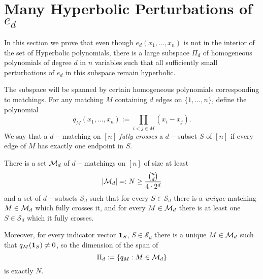 \section{Many Hyperbolic Perturbations of $e_d$} \label{sec:many-ed}
In this section we prove that even though $e_d(x_1,\ldots,x_n)$ is not in the
interior of the set of Hyperbolic polynomials, there is a large subspace
$\Pi_d$ of homogeneous polynomials of degree $d$ in $n$ variables such
that all sufficiently small perturbations of $e_d$ in this subspace remain
hyperbolic. 

The subspace will be spanned by certain homogeneous polynomials corresponding to matchings. For any matching $M$ containing $d$ edges on $\{1,\ldots,n\}$, define the polynomial
$$q_M(x_1,\ldots,x_n):=\prod_{i<j\in M}(x_i-x_j).$$
We say that a $d-$matching on $[n]$ {\em fully crosses} a $d-$subset $S$ of $[n]$ if every edge of $M$ has exactly one endpoint in $S$.
\renewcommand{\S}{\mathcal{S}}
\begin{lemma} \label{lem:manymatchings} There is a set $\mathcal{M}_d$ of $d-$matchings on $[n]$ of size at least 
$$|\mathcal{M}_d|=:N\ge \frac{\binom{n}{d}}{4\cdot 2^d}$$
and a set of $d-$subsets $\S_d$ such that for every $S\in\S_d$ there is a {\em unique} matching $M\in\mathcal{M}_d$ which fully crosses it, and for every $M\in\mathcal{M}_d$ there is at least one $S\in\S_d$ which it fully crosses.

Moreover, for every indicator vector $\mathbf{1}_S$, $S\in \S_d$ there is a unique $M\in\mathcal{M}_d$ such that $q_M(\mathbf{1}_S)\neq 0$, so the dimension of the span of 
$$\Pi_d:=\{q_M:M\in\mathcal{M}_d\}$$ is exactly $N$.
\end{lemma}
